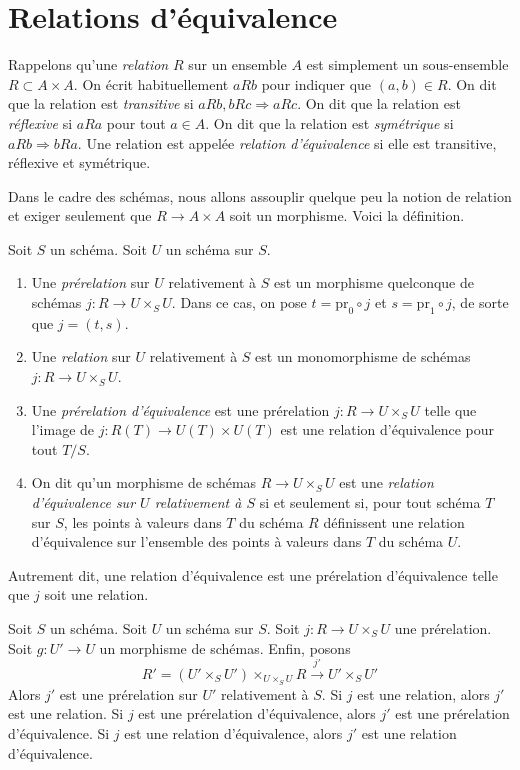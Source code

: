 \section{Relations d'équivalence}
\label{section-equivalence-relations}

\noindent
Rappelons qu'une {\it relation} $R$ sur un ensemble $A$ est simplement un sous-ensemble
$R \subset A \times A$. On écrit habituellement $a R b$ pour indiquer que
$(a, b) \in R$. On dit que la relation est {\it transitive} si
$a R b, b R c \Rightarrow a R c$. On dit que la relation est
{\it réflexive} si $a R a$ pour tout $a \in A$. On dit que la relation est
{\it symétrique} si $a R b \Rightarrow b R a$.
Une relation est appelée {\it relation d'équivalence} si
elle est transitive, réflexive et symétrique.

\medskip\noindent
Dans le cadre des schémas, nous allons assouplir quelque peu la notion de
relation et exiger seulement que $R \to A \times A$ soit
un morphisme. Voici la définition.

\begin{definition}
\label{definition-equivalence-relation}
Soit $S$ un schéma. Soit $U$ un schéma sur $S$.
\begin{enumerate}
\item Une {\it prérelation} sur $U$ relativement à $S$ est un morphisme quelconque
de schémas $j : R \to U \times_S U$. Dans ce cas, on pose
$t = \text{pr}_0 \circ j$ et $s = \text{pr}_1 \circ j$, de sorte
que $j = (t, s)$.
\item Une {\it relation} sur $U$ relativement à $S$ est un monomorphisme
de schémas $j : R \to U \times_S U$.
\item Une {\it prérelation d'équivalence} est une prérelation
$j : R \to U \times_S U$ telle que l'image de
$j : R(T) \to U(T) \times U(T)$ est une relation d'équivalence pour
tout $T/S$.
\item On dit qu'un morphisme de schémas $R \to U \times_S U$ est
une {\it relation d'équivalence sur $U$ relativement à $S$}
si et seulement si, pour tout schéma $T$ sur $S$, les points à valeurs dans $T$
du schéma $R$ définissent une relation d'équivalence
sur l'ensemble des points à valeurs dans $T$ du schéma $U$.
\end{enumerate}
\end{definition}

\noindent
Autrement dit, une relation d'équivalence est une prérelation d'équivalence
telle que $j$ soit une relation.

\begin{lemma}
\label{lemma-restrict-relation}
Soit $S$ un schéma.
Soit $U$ un schéma sur $S$.
Soit $j : R \to U \times_S U$ une prérelation.
Soit $g : U' \to U$ un morphisme de schémas.
Enfin, posons
$$
R' = (U' \times_S U')\times_{U \times_S U} R
\xrightarrow{j'}
U' \times_S U'
$$
Alors $j'$ est une prérelation sur $U'$ relativement à $S$.
Si $j$ est une relation, alors $j'$ est une relation.
Si $j$ est une prérelation d'équivalence, alors $j'$ est une prérelation d'équivalence.
Si $j$ est une relation d'équivalence, alors $j'$ est une relation d'équivalence.
\end{lemma}

